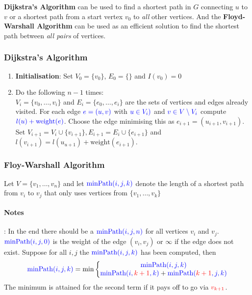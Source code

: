 \documentclass[11pt]{article}
\begin{document}
\textbf{Dijkstra's Algorithm} can be used to find a shortest path in $G$ connecting $u$ to $v$ or a shortest path from a start vertex $v_0$ to \emph{all} other vertices. And the \textbf{Floyd-Warshall Algorithm} can be used as an efficient solution to find the shortest path between \emph{all pairs} of vertices.

\subsubsection{Dijkstra's Algorithm}
\begin{enumerate}
	\item \textbf{Initialisation}: Set $V_0 = \{v_0\}$, $E_0 = \{\}$ and $I(v_0) = 0$
	\item Do the following $n-1$ times:\\
	$V_i = \{v_0, \dots, v_i\}$ and $E_i = \{e_0, \dots, e_i\}$ are the sets of vertices and edges already visited. For each edge ${\color{Blue1} e = (u,v)}$ with ${\color{Blue1} u\in V_i)}$ and ${\color{Blue1} v\in V\setminus V_i}$ compute ${\color{Blue1} l(u) + \text{weight}(e)}$. Choose the edge minimising this as $e_{i+1} = (u_{i+1}, v_{i+1})$.\\
	Set $V_{i+1} = V_i \cup \{v_{i+1}\}, E_{i+1} = E_i \cup \{e_{i+1}\}$ and $l(v_{i+1}) = l(u_{u+1}) + \text{weight}(e_{i+1})$.
\end{enumerate}

\subsubsection{Floy-Warshall Algorithm}

Let $V = \{v_1,\dots,v_n\}$ and let ${\color{Blue1} \text{minPath}(i,j,k)}$ denote the length of a shortest path from $v_i$ to $v_j$ that only uses vertices from $\{v_1, \dots, v_k\}$

\paragraph{Notes}: In the end there should be a ${\color{Blue1}\text{minPath}(i,j,n)}$ for all vertices $v_i$ and $v_j$. ${\color{Blue1}\text{minPath}(i,j,0)}$ is the weight of the edge $(v_i,v_j)$ or $\infty$ if the edge does not exist. Suppose for all $i,j$ the ${\color{Blue1}\text{minPath}(i,j,k)}$ has been computed, then
\begin{equation*}
	{\color{Blue1}\text{minPath}(i,j,k)} = \min\left\{ \begin{matrix}
	{\color{Blue1}\text{minPath}(i,j,k)}\\
	{\color{Blue1}\text{minPath}(i,{\color{Red1}k+1},k)} + {\color{Blue1}\text{minPath}({\color{Red1}k+1},j,k)}
	\end{matrix} \right.
\end{equation*}
The minimum is attained for the second term if it pays off to go via ${\color{Red1}v_{k+1}}$.
\end{document}
